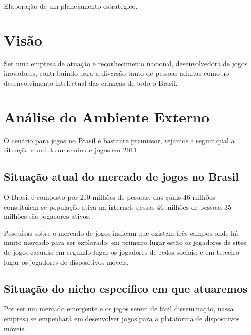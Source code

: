 \documentclass{abnt}
\begin{document}
	\capa
	
	\folhaderosto

	\sumario
	
	\begin{resumo}
		Elaboração de um planejamento estratégico.
	\end{resumo}

	\chapter {Visão}
		Ser uma empresa de atuação e reconhecimento nacional, desenvolvedora
		de jogos inovadores, contribuindo para a diversão tanto de pessoas 
		adultas como no desenvolvimento intelectual das crianças de todo o Brasil.
	
	\chapter {Análise do Ambiente Externo}
		O cenário para jogos no Brasil é bastante promissor, vejamos a seguir
		qual a situação atual do mercado de jogos em 2011.

		\section {Situação atual do mercado de jogos no Brasil}
		O Brasil é composto por 200 milhões de pessoas, das quais 46 milhões 
		constituiem-se população ativa na internet, dessas 46 milhões de pessoas
		35 milhões são jogadores ativos.

		Pesquisas sobre o mercado de jogos indicam que existem três campos
		onde há muito mercado para ser explorado: em primeiro lugar estão os 
		jogadores de sites de jogos casuais; em segundo lugar os jogadores
		de redes sociais; e em terceiro lugar os jogadores de dispositivos
		móveis.

		\section {Situação do nicho específico em que atuaremos}
		Por ser um mercado emergente e os jogos serem de fácil disseminação, 
		nossa empresa se empenhará em desenvolver jogos para a plataforma de
		dispositivos móveis.
\end{document}
